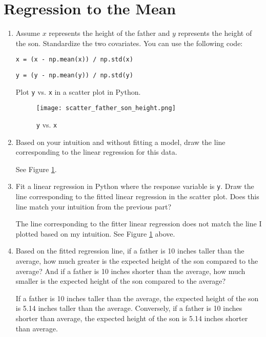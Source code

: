 \documentclass{article}
\begin{document}
\section{Regression to the Mean}
\begin{enumerate}[label={(\alph*)}]
    \item Assume $x$ represents the height of the father and $y$ 
    represents the height of the son. Standardize the two 
    covariates. You can use the following code:
    
    \lstinline{x = (x - np.mean(x)) / np.std(x)}
    
    \lstinline{y = (y - np.mean(y)) / np.std(y)}
    
    Plot \lstinline{y} vs. \lstinline{x} in a scatter plot in Python.
    \begin{figure}[h]
        \centering
        \texttt{[image: scatter\_father\_son\_height.png]}
        \caption{\lstinline{y} vs. \lstinline{x}}
        \label{fig:father_son}
    \end{figure}
    
    \item Based on your intuition and without fitting a model, draw the line corresponding to the linear regression for this data.
    
    See Figure \ref{fig:father_son}.
    
    \item Fit a linear regression in Python where the response variable is 
    \lstinline{y}. Draw the line corresponding to the fitted linear regression in the
    scatter plot. Does this line match your intuition from the previous part?
    
    The line corresponding to the fitter linear regression does not match the line I
    plotted based on my intuition. See Figure \ref{fig:father_son} above.
    
    \item Based on the fitted regression line, if a father is 10 inches taller than
    the average, how much greater is the expected height of the son compared to the
    average? And if a father is 10 inches shorter than the average, how much smaller
    is the expected height of the son compared to the average?
    
    If a father is 10 inches taller than the average, the expected height of the son
    is 5.14 inches taller than the average. Conversely, if a father is 10 inches
    shorter than average, the expected height of the son is 5.14 inches shorter
    than average.
    

\end{enumerate}
\end{document}
